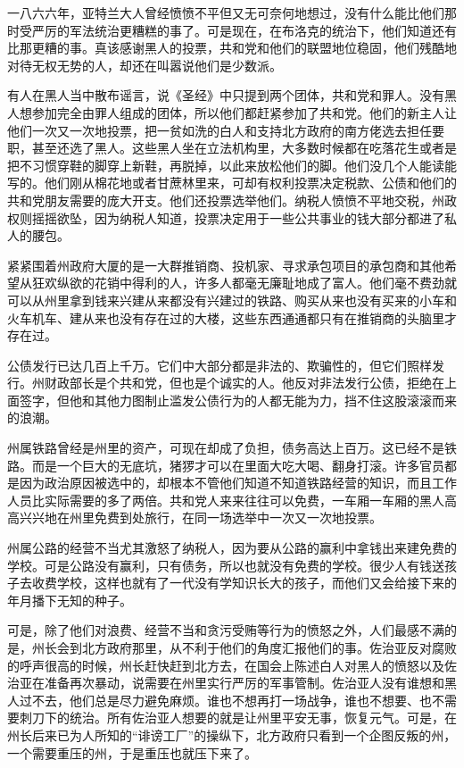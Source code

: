 \par 一八六六年，亚特兰大人曾经愤愤不平但又无可奈何地想过，没有什么能比他们那时受严厉的军法统治更糟糕的事了。可是现在，在布洛克的统治下，他们知道还有比那更糟的事。真该感谢黑人的投票，共和党和他们的联盟地位稳固，他们残酷地对待无权无势的人，却还在叫嚣说他们是少数派。
\par 有人在黑人当中散布谣言，说《圣经》中只提到两个团体，共和党和罪人。没有黑人想参加完全由罪人组成的团体，所以他们都赶紧参加了共和党。他们的新主人让他们一次又一次地投票，把一贫如洗的白人和支持北方政府的南方佬选去担任要职，甚至还选了黑人。这些黑人坐在立法机构里，大多数时候都在吃落花生或者是把不习惯穿鞋的脚穿上新鞋，再脱掉，以此来放松他们的脚。他们没几个人能读能写的。他们刚从棉花地或者甘蔗林里来，可却有权利投票决定税款、公债和他们的共和党朋友需要的庞大开支。他们还投票选举他们。纳税人愤愤不平地交税，州政权则摇摇欲坠，因为纳税人知道，投票决定用于一些公共事业的钱大部分都进了私人的腰包。
\par 紧紧围着州政府大厦的是一大群推销商、投机家、寻求承包项目的承包商和其他希望从狂欢纵欲的花销中得利的人，许多人都毫无廉耻地成了富人。他们毫不费劲就可以从州里拿到钱来兴建从来都没有兴建过的铁路、购买从来也没有买来的小车和火车机车、建从来也没有存在过的大楼，这些东西通通都只有在推销商的头脑里才存在过。
\par 公债发行已达几百上千万。它们中大部分都是非法的、欺骗性的，但它们照样发行。州财政部长是个共和党，但也是个诚实的人。他反对非法发行公债，拒绝在上面签字，但他和其他力图制止滥发公债行为的人都无能为力，挡不住这股滚滚而来的浪潮。
\par 州属铁路曾经是州里的资产，可现在却成了负担，债务高达上百万。这已经不是铁路。而是一个巨大的无底坑，猪猡才可以在里面大吃大喝、翻身打滚。许多官员都是因为政治原因被选中的，却根本不管他们知道不知道铁路经营的知识，而且工作人员比实际需要的多了两倍。共和党人来来往往可以免费，一车厢一车厢的黑人高高兴兴地在州里免费到处旅行，在同一场选举中一次又一次地投票。
\par 州属公路的经营不当尤其激怒了纳税人，因为要从公路的赢利中拿钱出来建免费的学校。可是公路没有赢利，只有债务，所以也就没有免费的学校。很少人有钱送孩子去收费学校，这样也就有了一代没有学知识长大的孩子，而他们又会给接下来的年月播下无知的种子。
\par 可是，除了他们对浪费、经营不当和贪污受贿等行为的愤怒之外，人们最感不满的是，州长会到北方政府那里，从不利于他们的角度汇报他们的事。佐治亚反对腐败的呼声很高的时候，州长赶快赶到北方去，在国会上陈述白人对黑人的愤怒以及佐治亚在准备再次暴动，说需要在州里实行严厉的军事管制。佐治亚人没有谁想和黑人过不去，他们总是尽力避免麻烦。谁也不想再打一场战争，谁也不想要、也不需要刺刀下的统治。所有佐治亚人想要的就是让州里平安无事，恢复元气。可是，在州长后来已为人所知的“诽谤工厂”的操纵下，北方政府只看到一个企图反叛的州，一个需要重压的州，于是重压也就压下来了。
